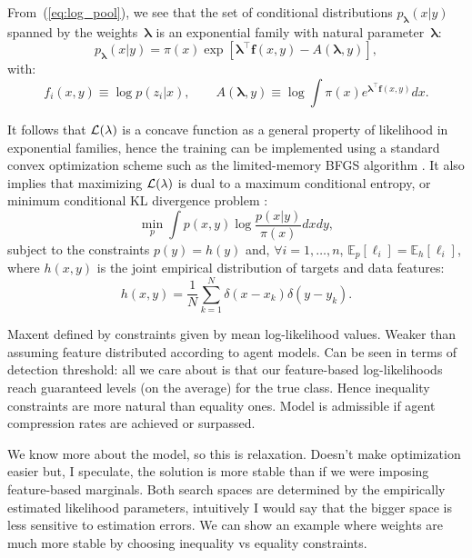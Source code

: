 \documentclass[english]{scrartcl}
\newcommand{\E}{\mathbb{E}}
\newcommand{\lda}{{\boldsymbol{\lambda}}}
\begin{document}
From~(\ref{eq:log_pool}), we see that the set of conditional distributions $p_\lda(x|y)$ spanned by the weights~$\lda$ is an exponential family with natural parameter~$\lda$:
$$
p_\lda(x|y) = \pi(x) \exp[\lda^\top \mathbf{f}(x,y) - A(\lda,y)],
$$
with:
$$
f_i(x,y) \equiv \log p(z_i|x),
\qquad
A(\lda, y) \equiv \log \int \pi(x) e^{\lda^\top \mathbf{f}(x,y)} dx.
$$

It follows that ${\cal L}(\lambda)$ is a concave function as a general property of likelihood in exponential families, hence the training can be implemented using a standard convex optimization scheme such as the limited-memory BFGS algorithm \cite{Byrd-95}. It also implies that maximizing ${\cal L}(\lambda)$ is dual to a maximum conditional entropy, or minimum conditional KL divergence problem \cite{BergerA-96}:
$$
\min_{p} \int p(x,y) \log \frac{p(x|y)}{\pi(x)} dx dy,
$$
subject to the constraints $p(y) = h(y)$ and, $\forall i=1,\ldots,n$, $\E_p[\ell_i]=\E_h[\ell_i]$, 
where $h(x,y)$ is the joint empirical distribution of targets and data features:
$$
h(x,y) = \frac{1}{N} \sum_{k=1}^N \delta(x-x_k)\delta(y-y_k).
$$

Maxent defined by constraints given by mean log-likelihood values. Weaker than assuming feature distributed according to agent models. Can be seen in terms of detection threshold: all we care about is that our feature-based log-likelihoods reach guaranteed levels (on the average) for the true class. Hence inequality constraints are more natural than equality ones. Model is admissible if agent compression rates are achieved or surpassed.

We know more about the model, so this is relaxation. Doesn't make optimization easier but, I speculate, the solution is more stable than if we were imposing feature-based marginals. Both search spaces are determined by the empirically estimated likelihood parameters, intuitively I would say that the bigger space is less sensitive to estimation errors. We can show an example where weights are much more stable by choosing inequality vs equality constraints.


\end{document}
